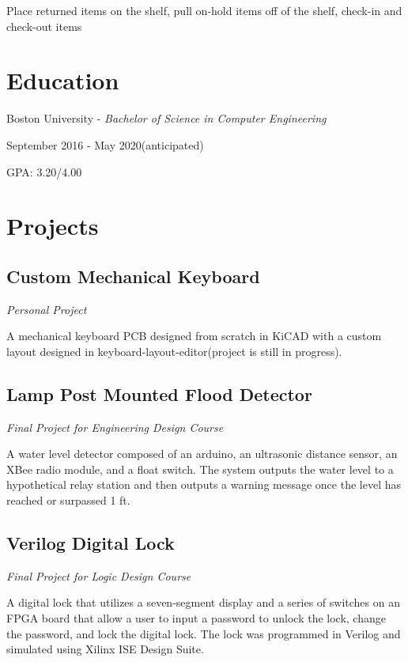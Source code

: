 \documentclass{article}
\begin{document}
Place returned items on the shelf, pull on-hold items off of the shelf, check-in and check-out items

\section{Education}
Boston University - \textit{Bachelor of Science in Computer Engineering}

September 2016 - May 2020(anticipated)

GPA: 3.20/4.00

\section{Projects}
\subsection{Custom Mechanical Keyboard} \textit{Personal Project}

A mechanical keyboard PCB designed from scratch in KiCAD with a custom layout designed in keyboard-layout-editor(project is still in progress).
\subsection{Lamp Post Mounted Flood Detector} \textit{Final Project for Engineering Design Course}

A water level detector composed of an arduino, an ultrasonic distance sensor, an XBee radio module, and a float switch. The system outputs the water level to a hypothetical relay station and then outputs a warning message once the level has reached or surpassed 1 ft.
\subsection{Verilog Digital Lock} \textit{Final Project for Logic Design Course}

A digital lock that utilizes a seven-segment display and a series of switches on an FPGA board that allow a user to input a password to unlock the lock, change the password, and lock the digital lock. The lock was programmed in Verilog and simulated using Xilinx ISE Design Suite.
\end{document}
